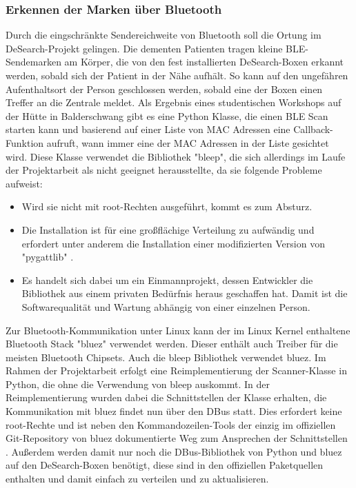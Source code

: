 \subsubsection{Erkennen der Marken über Bluetooth}
Durch die eingschränkte Sendereichweite von Bluetooth soll die Ortung im DeSearch-Projekt gelingen. Die dementen Patienten tragen kleine BLE-Sendemarken am Körper, die von den fest installierten DeSearch-Boxen erkannt werden, sobald sich der Patient in der Nähe aufhält. So kann auf den ungefähren Aufenthaltsort der Person geschlossen werden, sobald eine der Boxen einen Treffer an die Zentrale meldet. \newline
Als Ergebnis eines studentischen Workshops auf der Hütte in Balderschwang gibt es eine Python Klasse, die einen BLE Scan starten kann und basierend auf einer Liste von MAC Adressen eine Callback-Funktion aufruft, wann immer eine der MAC Adressen in der Liste gesichtet wird.
Diese Klasse verwendet die Bibliothek "bleep", die sich allerdings im Laufe der Projektarbeit als nicht geeignet herausstellte, da sie folgende Probleme aufweist:
\begin{itemize}
	\item Wird sie nicht mit root-Rechten ausgeführt, kommt es zum Absturz.
	\item Die Installation ist für eine großflächige Verteilung zu aufwändig und erfordert unter anderem die Installation einer modifizierten Version von "pygattlib" \citep[Vgl.][]{bleep-installation}.
	\item Es handelt sich dabei um ein Einmannprojekt, dessen Entwickler die Bibliothek aus einem privaten Bedürfnis heraus geschaffen hat. Damit ist die Softwarequalität und Wartung abhängig von einer einzelnen Person.
\end{itemize}
Zur Bluetooth-Kommunikation unter Linux kann der im Linux Kernel enthaltene Bluetooth Stack "bluez" verwendet werden. Dieser enthält auch Treiber für die meisten Bluetooth Chipsets.
Auch die bleep Bibliothek verwendet bluez. Im Rahmen der Projektarbeit erfolgt eine Reimplementierung der Scanner-Klasse in Python, die ohne die Verwendung von bleep auskommt.
In der Reimplementierung wurden dabei die Schnittstellen der Klasse erhalten, die Kommunikation mit bluez findet nun über den DBus statt. Dies erfordert keine root-Rechte und ist neben den Kommandozeilen-Tools der einzig im offiziellen Git-Repository von bluez dokumentierte Weg zum Ansprechen der Schnittstellen \citep[Vgl.][]{bluez-git}. Außerdem werden damit nur noch die DBus-Bibliothek von Python und bluez auf den DeSearch-Boxen benötigt, diese sind in den offiziellen Paketquellen enthalten und damit einfach zu verteilen und zu aktualisieren.


